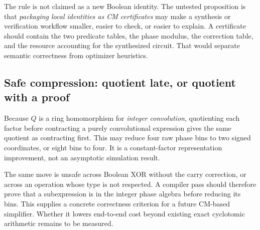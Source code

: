 The rule is not claimed as a new Boolean identity. The untested proposition is that \emph{packaging local identities as CM certificates} may make a synthesis or verification workflow smaller, easier to check, or easier to explain. A certificate should contain the two predicate tables, the phase modulus, the correction table, and the resource accounting for the synthesized circuit. That would separate semantic correctness from optimizer heuristics.

\subsection{Safe compression: quotient late, or quotient with a proof}
Because $Q$ is a ring homomorphism for \emph{integer convolution}, quotienting each factor before contracting a purely convolutional expression gives the same quotient as contracting first. This may reduce four raw phase bins to two signed coordinates, or eight bins to four. It is a constant-factor representation improvement, not an asymptotic simulation result.

The same move is unsafe across Boolean XOR without the carry correction, or across an operation whose type is not respected. A compiler pass should therefore prove that a subexpression is in the integer phase algebra before reducing its bins. This supplies a concrete correctness criterion for a future CM-based simplifier. Whether it lowers end-to-end cost beyond existing exact cyclotomic arithmetic remains to be measured.

